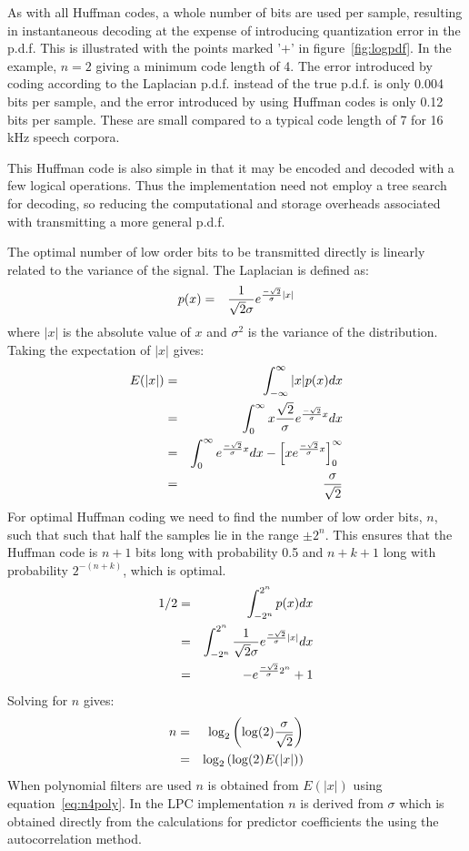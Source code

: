 As with all Huffman codes, a whole number of bits are used per sample,
resulting in instantaneous decoding at the expense of introducing
quantization error in the p.d.f.  This is illustrated with the points
marked '$+$' in figure~\ref{fig:logpdf}.  In the example, $n = 2$ giving a
minimum code length of 4.  The error introduced by coding according to
the Laplacian p.d.f. instead of the true p.d.f. is only 0.004 bits per
sample, and the error introduced by using Huffman codes is only 0.12
bits per sample.  These are small compared to a typical code length of 7
for 16 kHz speech corpora.

This Huffman code is also simple in that it may be encoded and decoded
with a few logical operations.  Thus the implementation need not employ
a tree search for decoding, so reducing the computational and storage
overheads associated with transmitting a more general p.d.f.

The optimal number of low order bits to be transmitted directly is
linearly related to the variance of the signal.  The Laplacian is
defined as:
\begin{eqnarray}
p(x) & = & { 1 \over {\sqrt 2 } \sigma } e^{{- \sqrt 2 \over \sigma} | x |}
\end{eqnarray}
where $|x|$ is the absolute value of $x$ and $\sigma^2$ is the variance of the
distribution.  Taking the expectation of $|x|$ gives:
\begin{eqnarray}
E(|x|)	& = & \int_{-\infty}^\infty |x|  p(x) dx \\
	& = & \int_0^\infty x {{\sqrt 2} \over \sigma} e^{{- \sqrt 2 \over \sigma} x } dx \\
	& = & \int_0^\infty e^{{- \sqrt 2 \over \sigma} x } dx - 
	\left[ x e^{{- \sqrt 2 \over \sigma} x } \right]_0^\infty \\
	& = & {\sigma \over \sqrt 2}
\end{eqnarray}
For optimal Huffman coding we need to find the number of low order bits,
$n$, such that such that half the samples lie in the range $\pm 2^n$.
This ensures that the Huffman code is $n + 1$ bits long with probability
0.5 and $n + k + 1$ long with probability $2^{-(n + k)}$, which is
optimal.
\begin{eqnarray}
1/2 & = & \int_{-2^n}^{2^n} p(x) dx \\
    & = & \int_{-2^n}^{2^n}  { 1 \over {\sqrt 2 } \sigma } e^{{- \sqrt 2
\over \sigma} | x |} dx \\
    & = & - e^{{- \sqrt 2 \over \sigma} 2^n} + 1 \\
\end{eqnarray}
Solving for $n$ gives:
\begin{eqnarray}
n & = & \log_2 \left( \log(2) {\sigma \over \sqrt 2 } \right)\label{eq:n4lpc}\\
  & = & \log_2 \left(\log(2) E(|x|)  \right) \label{eq:n4poly}
\end{eqnarray}
When polynomial filters are used $n$ is obtained from $E(|x|)$ using
equation~\ref{eq:n4poly}.  In the LPC implementation $n$ is derived
from $\sigma$ which is obtained directly from the calculations for
predictor coefficients the using the autocorrelation method.

